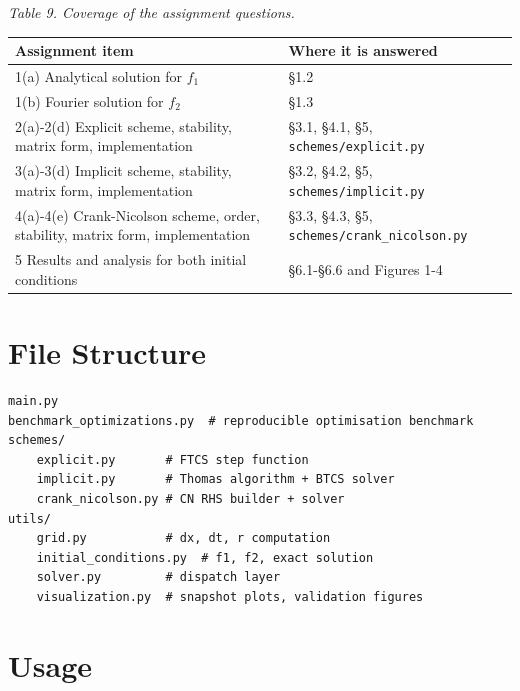 \documentclass[11pt,a4paper]{article}
\begin{document}
\emph{Table 9. Coverage of the assignment questions.}

\begin{center}
\renewcommand{\arraystretch}{1.15}
\begin{tabular}{|p{}|p{}|}
\hline
Assignment item & Where it is answered \\
\hline
1(a) Analytical solution for $f_1$ & §1.2 \\
1(b) Fourier solution for $f_2$ & §1.3 \\
2(a)-2(d) Explicit scheme, stability, matrix form, implementation & §3.1, §4.1, §5, \texttt{schemes/explicit.py} \\
3(a)-3(d) Implicit scheme, stability, matrix form, implementation & §3.2, §4.2, §5, \texttt{schemes/implicit.py} \\
4(a)-4(e) Crank-Nicolson scheme, order, stability, matrix form, implementation & §3.3, §4.3, §5, \texttt{schemes/crank\_nicolson.py} \\
5 Results and analysis for both initial conditions & §6.1-§6.6 and Figures 1-4 \\
\hline
\end{tabular}
\end{center}

\appendix
\section{File Structure}

\begin{verbatim}
main.py
benchmark_optimizations.py  # reproducible optimisation benchmark
schemes/
    explicit.py       # FTCS step function
    implicit.py       # Thomas algorithm + BTCS solver
    crank_nicolson.py # CN RHS builder + solver
utils/
    grid.py           # dx, dt, r computation
    initial_conditions.py  # f1, f2, exact solution
    solver.py         # dispatch layer
    visualization.py  # snapshot plots, validation figures
\end{verbatim}

\section{Usage}
\end{document}
